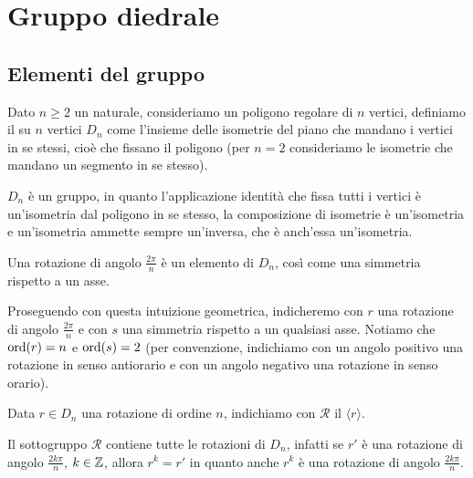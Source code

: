 \documentclass[11pt]{scrartcl}
\begin{document}
\newpage

\section{Gruppo diedrale}

\subsection{Elementi del gruppo}

\begin{definition}
    Dato $n \geqslant 2$ un naturale, consideriamo un poligono regolare di $n$ vertici,
    definiamo il  su $n$ vertici $D_n$ come l'insieme 
    delle isometrie del piano che mandano i vertici in se stessi, cioè che 
    fissano il poligono (per $n = 2$ consideriamo le isometrie che mandano un 
    segmento in se stesso).
\end{definition}

\begin{remark}
    $D_n$ è un gruppo, in quanto l'applicazione identità che 
    fissa tutti i vertici è un'isometria dal poligono in se stesso, la 
    composizione di isometrie è un'isometria e un'isometria ammette sempre 
    un'inversa, che è anch'essa un'isometria.
\end{remark}

\begin{remark}
    Una rotazione di angolo $\displaystyle\frac{2\pi}{n}$ è un elemento di $D_n$,
    così come una simmetria rispetto a un asse.
\end{remark}

Proseguendo con questa intuizione geometrica, indicheremo con $r$ una rotazione
di angolo $\displaystyle \frac{2\pi}{n}$ e con $s$ una simmetria rispetto a
un qualsiasi asse. Notiamo che $\operatorname{ord}(r) = n$ e $\operatorname{ord}(s) = 2$ (per convenzione, 
indichiamo con un angolo positivo una rotazione in senso antiorario e con un 
angolo negativo una rotazione in senso orario).

\begin{definition}
    Data $r \in D_n$ una rotazione di ordine $n$, indichiamo con $\mathcal{R}$ il
     $\langle r\rangle$.
\end{definition}

\begin{remark}
    Il sottogruppo $\mathcal{R}$ contiene tutte le rotazioni di $D_n$, infatti
    se $r'$ è una rotazione di angolo $\displaystyle\frac{2k\pi}{n}$, $k \in \mathbb Z$,
    allora $r^k = r'$ in quanto anche $r^k$ è una rotazione di angolo 
    $\displaystyle\frac{2k\pi}{n}$.
\end{remark}
\end{document}
